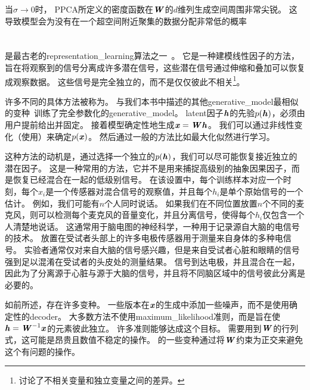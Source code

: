 当$\sigma\xrightarrow{} 0$时， \gls{PPCA}所定义的密度函数在$\boldsymbol{\mathit{W}}$的$d$维列生成空间周围非常尖锐。
这导致模型会为没有在一个超空间附近聚集的数据分配非常低的概率

\section{}
\label{sec:independent_component_analysis_ica}


是最古老的\gls{representation_learning}算法之一~\citep{Herault+Ans-1984,Jutten+Herault-91,Comon94,Hyvarinen-1999,Hyvarinen-2001,Hinton-ICA-2001,Teh-2003}。
它是一种建模线性因子的方法，旨在将观察到的信号分离成许多潜在信号，这些潜在信号通过伸缩和叠加可以恢复成观察数据。
这些信号是完全独立的，而不是仅仅彼此不相关\footnote{讨论了不相关变量和独立变量之间的差异。}。


许多不同的具体方法被称为。
与我们本书中描述的其他\gls{generative_model}最相似的变种~\citep{Pham-et-al-1992}训练了完全参数化的\gls{generative_model}。
\gls{latent}因子$\boldsymbol{\mathit{h}}$的先验$p(\boldsymbol{\mathit{h}})$，必须由用户提前给出并固定。
接着模型确定性地生成$\boldsymbol{\mathit{x}} = \boldsymbol{\mathit{W}} \boldsymbol{\mathit{h}}$。
我们可以通过非线性变化（使用）来确定$p(\boldsymbol{\mathit{x}})$。
然后通过一般的方法比如最大化似然进行学习。


这种方法的动机是，通过选择一个独立的$p(\boldsymbol{\mathit{h}})$，我们可以尽可能恢复接近独立的潜在因子。
这是一种常用的方法，它并不是用来捕捉高级别的抽象因果因子，而是恢复已经混合在一起的低级别信号。
在该设置中，每个训练样本对应一个时刻，每个$x_i$是一个传感器对混合信号的观察值，并且每个$h_i$是单个原始信号的一个估计。
例如，我们可能有$n$个人同时说话。 
如果我们在不同位置放置$n$个不同的麦克风，则可以检测每个麦克风的音量变化，并且分离信号，使得每个$h_i$仅包含一个人清楚地说话。
这通常用于脑电图的神经科学，一种用于记录源自大脑的电信号的技术。
放置在受试者头部上的许多电极传感器用于测量来自身体的多种电信号。
实验者通常仅对来自大脑的信号感兴趣，但是来自受试者心脏和眼睛的信号强到足以混淆在受试者的头皮处的测量结果。
信号到达电极，并且混合在一起，因此为了分离源于心脏与源于大脑的信号，并且将不同脑区域中的信号彼此分离是必要的。


如前所述，存在许多变种。
一些版本在$\boldsymbol{\mathit{x}}$的生成中添加一些噪声，而不是使用确定性的\gls{decoder}。
大多数方法不使用\gls{maximum_likelihood}准则，而是旨在使$\boldsymbol{\mathit{h}} = \boldsymbol{\mathit{W}}^{-1}\boldsymbol{\mathit{x}}$的元素彼此独立。
许多准则能够达成这个目标。
需要用到$\boldsymbol{\mathit{W}}$的行列式，这可能是昂贵且数值不稳定的操作。
的一些变种通过将$\boldsymbol{\mathit{W}}$约束为正交来避免这个有问题的操作。


